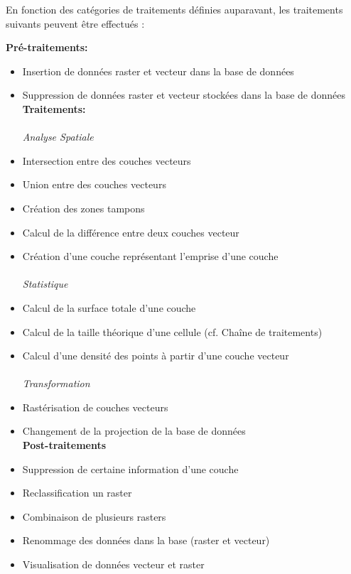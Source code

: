 En fonction des catégories de traitements définies auparavant, les traitements suivants peuvent être effectués :

\textbf{Pré-traitements:}\\

\begin{itemize}
\item Insertion de données raster et  vecteur dans la base de données
\item Suppression de données  raster et  vecteur stockées dans la base de données\\

\textbf{Traitements:}\\\\
\textit{Analyse Spatiale}
\item Intersection entre des couches vecteurs
\item Union entre des couches vecteurs
\item Création des zones tampons
\item Calcul de la différence entre deux couches vecteur
\item Création d'une couche représentant l'emprise d'une couche\\\\ \textit{Statistique}
\item Calcul de la surface totale d'une couche
\item Calcul de la taille théorique d'une cellule (cf. Chaîne de traitements)
\item Calcul d'une densité des points à partir d'une couche vecteur\\\\
\textit{Transformation}

\item Rastérisation de couches vecteurs
\item Changement de la projection de la base de données\\

\textbf{Post-traitements}\\
\item Suppression de certaine information d'une couche
\item Reclassification un raster
\item Combinaison de plusieurs rasters
\item Renommage des données dans la base (raster et vecteur)
\item Visualisation de données vecteur et  raster
\end{itemize}


